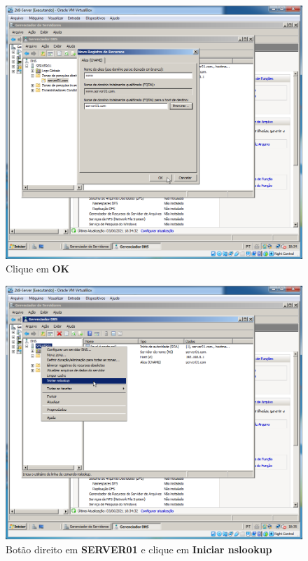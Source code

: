 \documentclass[10pt]{article}
\begin{document}
\begin{figure}[H]
    \centering
    \caption{Clique em \textbf{OK}}
    \label{fig:DNS039}
    \includegraphics[width=\linewidth]{images/windows_server/dns/039.png}
\end{figure}
\begin{figure}[H]
    \centering
    \caption{Botão direito em \textbf{SERVER01} e clique em \textbf{Iniciar nslookup}}
    \label{fig:DNS040}
    \includegraphics[width=\linewidth]{images/windows_server/dns/040.png}
\end{figure}
\end{document}
